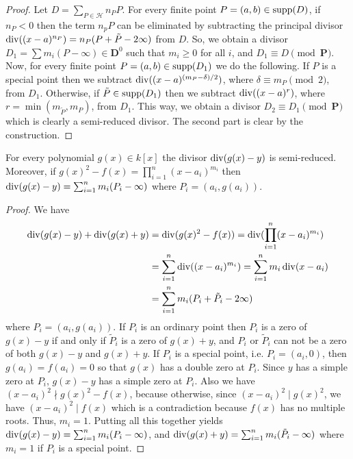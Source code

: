 \begin{proof}
Let $D = \sum_{P \in \mathcal{H}} n_PP$. For every finite point $P = (a, b) \in \operatorname{supp}(D)$, if $n_P < 
0$ then the term $n_pP$ can be eliminated by subtracting the principal divisor $\operatorname{div}((x - 
a)^{n_P}) = n_P(P + \tilde{P} - 2\infty)$ from $D$. So, we obtain a divisor $D_1 = \sum m_i(P - 
\infty) \in \mathbf{D}^0$ such that $m_i \ge 0$ for all $i$, and $D_1 \equiv D \pmod {\mathbf{P}}$. 
Now, for every finite point $P = (a, b) \in \operatorname{supp}(D_1)$ we do the following. If $P$ is a special 
point then we subtract $\operatorname{div}((x - a)^{(m_P - \delta) / 2})$, where $\delta \equiv m_P \pmod 2$, 
from $D_1$. Otherwise, if $\tilde{P} \in \operatorname{supp}(D_1)$ then we subtract $\operatorname{div}((x - a)^r)$, where 
$r = \min(m_{\tilde{P}}, m_P)$, from $D_1$. This way, we obtain a divisor $D_2 \equiv D_1 \pmod 
{\mathbf{P}}$ which is clearly a semi-reduced divisor. The second part is clear by the construction.
\end{proof}
\begin{proposition}
\label{proposition:always-semi}
For every polynomial $g(x) \in k[x]$ the divisor $\operatorname{div}(g(x) - y)$ is semi-reduced. Moreover, if 
$g(x)^2 - f(x) = \prod_{i = 1}^n(x - a_i)^{m_i}$ then $\operatorname{div}(g(x) - y) = \sum_{i = 1}^nm_i(P_i - 
\infty)$ where $P_i = (a_i, g(a_i))$.
\end{proposition}
\begin{proof}
We have 
\begin{align*}
\operatorname{div}(g(x) - y) + \operatorname{div}(g(x) + y) 
&= \operatorname{div}(g(x)^2 - f(x)) = \operatorname{div}(\prod_{i = 1}^n(x - a_i)^{m_i}) \\
&= \sum_{i = 1}^n \operatorname{div}((x - a_i)^{m_i}) = \sum_{i = 1}^n m_i\operatorname{div}(x - a_i) \\
&= \sum_{i = 1}^n m_i(P_i + \tilde{P}_i - 2\infty)
\end{align*}
where $P_i = (a_i, g(a_i))$. If $P_i$ is an ordinary point then $P_i$ is a zero of $g(x) - y$ if and 
only if $\tilde{P}_i$ is a zero of $g(x) + y$, and $P_i$ or $\tilde{P}_i$ can not be a zero of both 
$g(x) - y$ and $g(x) + y$. If $P_i$ is a special point, i.e. $P_i = (a_i, 0)$, then $g(a_i) = f(a_i) 
= 0$ so that $g(x)$ has a double zero at $P_i$. Since $y$ has a simple zero at $P_i$, $g(x) - y$ has 
a simple zero at $P_i$. Also we have $(x - a_i)^2 \nmid g(x)^2 - f(x)$, because otherwise, since $(x 
- a_i)^2 \mid g(x)^2$, we have $(x - a_i)^2 \mid f(x)$ which is a contradiction because $f(x)$ has 
no multiple roots. Thus, $m_i = 1$. Putting all this together yields $\operatorname{div}(g(x) - y) = \sum_{i = 
1}^nm_i(P_i - \infty)$, and $\operatorname{div}(g(x) + y) = \sum_{i = 1}^nm_i(\tilde{P}_i - \infty)$ where 
$m_i = 1$ if $P_i$ is a special point.
\end{proof}
